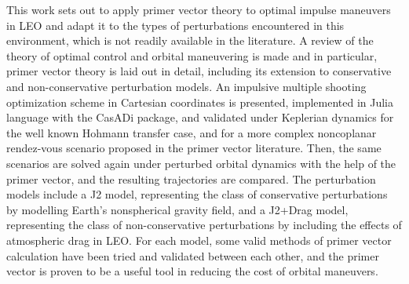 This work sets out to apply primer vector theory to optimal impulse maneuvers in LEO and adapt it to the types of perturbations encountered in this environment, which is not readily available in the literature. A review of the theory of optimal control and orbital maneuvering is made and in particular, primer vector theory is laid out in detail, including its extension to conservative and non-conservative perturbation models. An impulsive multiple shooting optimization scheme in Cartesian coordinates is presented, implemented in Julia language with the CasADi package, and validated under Keplerian dynamics for the well known Hohmann transfer case, and for a more complex noncoplanar rendez-vous scenario proposed in the primer vector literature. Then, the same scenarios are solved again under perturbed orbital dynamics with the help of the primer vector, and the resulting trajectories are compared. The perturbation models include a J2 model, representing the class of conservative perturbations by modelling Earth's nonspherical gravity field, and a J2+Drag model, representing the class of non-conservative perturbations by including the effects of atmospheric drag in LEO\@. For each model, some valid methods of primer vector calculation have been tried and validated between each other, and the primer vector is proven to be a useful tool in reducing the cost of orbital maneuvers.